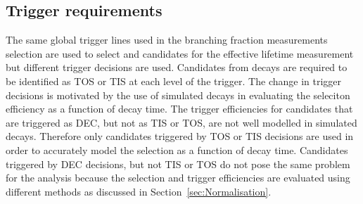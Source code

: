 \subsection{Trigger requirements}
\label{sec:ELtrigger}
The same global trigger lines used in the branching fraction measurements selection are used to select \bsmumu and \bhh candidates for the effective lifetime measurement but different trigger decisions are used. 
Candidates from \bsmumu decays are required to be identified as TOS or TIS at each level of the trigger. The change in trigger decisions is motivated by the use of simulated decays in evaluating the seleciton efficiency as a function of decay time.
The trigger efficiencies for candidates that are triggered as DEC, but not as TIS or TOS, are not well modelled in simulated decays. Therefore only candidates triggered by TOS or TIS decisions are used in order to accurately model the selection as a function of decay time. %
Candidates triggered by DEC decisions, but not TIS or TOS do not pose the same problem for the \BF analysis because the selection and trigger efficiencies are evaluated using different methods as discussed in Section~\ref{sec:Normalisation}.

